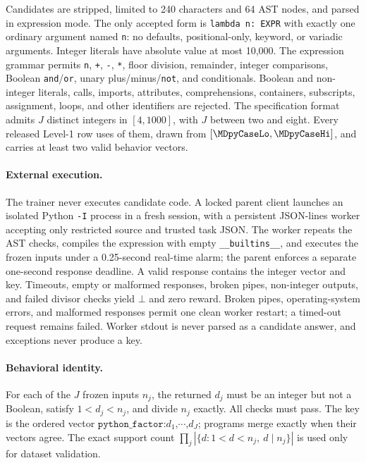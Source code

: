 \documentclass{article}
\newcommand{\1}{\mathbf 1}
\theoremstyle{remark}
\theoremstyle{definition}
\theoremstyle{plain}
\begin{document}
Candidates are stripped, limited to 240 characters and 64 AST nodes, and
parsed in expression mode. The only accepted form is \texttt{lambda n: EXPR}
with exactly one ordinary argument named \texttt{n}: no defaults,
positional-only, keyword, or variadic arguments. Integer literals have
absolute value at most 10,000. The expression grammar permits \texttt{n},
\texttt{+}, \texttt{-}, \texttt{*}, floor division, remainder, integer
comparisons, Boolean \texttt{and}/\texttt{or}, unary plus/minus/\texttt{not},
and conditionals. Boolean and non-integer literals, calls, imports,
attributes, comprehensions, containers, subscripts, assignment, loops, and
other identifiers are rejected. The specification format admits $J$ distinct
integers in $[4,1000]$, with $J$ between two and eight. Every released Level-1
row uses \MDpyCases{} of them, drawn from $[\MDpyCaseLo,\MDpyCaseHi]$, and
carries at least two valid behavior vectors.

\paragraph{External execution.}
\label{app:python-process}
The trainer never executes candidate code. A locked parent client launches
an isolated Python \texttt{-I} process in a fresh session, with a persistent
JSON-lines worker accepting only restricted source and trusted task JSON.
The worker repeats the AST checks, compiles the expression with empty
\texttt{\_\_builtins\_\_}, and executes the frozen inputs under a
0.25-second real-time alarm; the parent enforces a separate one-second
response deadline. A valid response contains the integer vector and key.
Timeouts, empty or malformed responses, broken pipes, non-integer outputs,
and failed divisor checks yield $\bot$ and zero reward. Broken pipes,
operating-system errors, and malformed responses permit one clean worker
restart; a timed-out request remains failed. Worker stdout is never parsed
as a candidate answer, and exceptions never produce a key.

\paragraph{Behavioral identity.}
\label{app:python-identity}
For each of the $J$ frozen inputs $n_j$, the returned $d_j$ must be an integer
but not a Boolean, satisfy $1<d_j<n_j$, and divide $n_j$ exactly. All checks
must pass. The key is the ordered vector
$\texttt{python\_factor:}d_1\texttt{,}\cdots\texttt{,}d_J$;
programs merge exactly when their vectors agree. The exact support count
$\prod_j|\{d:1<d<n_j,\ d\mid n_j\}|$ is used only for dataset validation.
\end{document}
